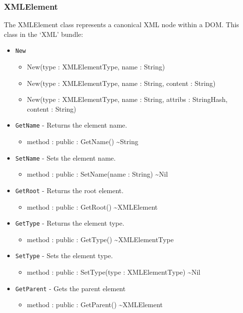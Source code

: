 \documentclass[12pt]{article}
\begin{document}
\subsubsection{XMLElement}
The XMLElement class represents a canonical XML node within a
DOM. This class in the `XML' bundle:
\begin{itemize}
\item \texttt{New}
  \begin{itemize}
  \item New(type : XMLElementType, name : String)
  \item New(type : XMLElementType, name : String, content : String)
  \item New(type : XMLElementType, name : String, attribs :
    StringHash, content : String)
  \end{itemize}
\item \texttt{GetName} - Returns the element name.
  \begin{itemize}
  \item method : public : GetName() \textasciitilde String
  \end{itemize}
\item \texttt{SetName} - Sets the element name.
  \begin{itemize}
  \item method : public : SetName(name : String) \textasciitilde Nil
  \end{itemize}
\item \texttt{GetRoot} - Returns the root element.
  \begin{itemize}
  \item method : public : GetRoot() \textasciitilde XMLElement
  \end{itemize}
\item \texttt{GetType} - Returns the element type.
  \begin{itemize}
  \item method : public : GetType() \textasciitilde XMLElementType
  \end{itemize}
\item \texttt{SetType} - Sets the element type.
  \begin{itemize}
  \item method : public : SetType(type : XMLElementType) \textasciitilde Nil
  \end{itemize}
\item \texttt{GetParent} - Gets the parent element
  \begin{itemize}
  \item method : public : GetParent() \textasciitilde XMLElement

\end{itemize}
\end{itemize}
\end{document}
